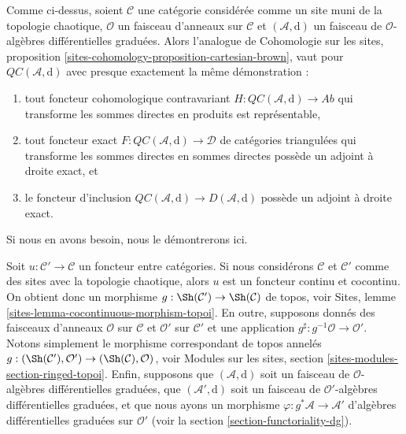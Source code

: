 \begin{remark}
\label{remark-cartesian-brown}
Comme ci-dessus, soient $\mathcal{C}$ une catégorie considérée comme
un site muni de la topologie chaotique, $\mathcal{O}$ un faisceau d'anneaux sur $\mathcal{C}$
et $(\mathcal{A}, \text{d})$ un faisceau de
$\mathcal{O}$-algèbres différentielles graduées. Alors l'analogue
de Cohomologie sur les sites,
proposition \ref{sites-cohomology-proposition-cartesian-brown},
vaut pour $\mathit{QC}(\mathcal{A}, \text{d})$ avec
presque exactement la même
démonstration : \begin{enumerate}
\item tout foncteur cohomologique
contravariant $H : \mathit{QC}(\mathcal{A}, \text{d}) \to \textit{Ab}$
qui transforme les sommes directes en produits est
représentable, \item tout
foncteur exact $F : \mathit{QC}(\mathcal{A}, \text{d}) \to \mathcal{D}$
de catégories triangulées qui transforme les sommes directes en
sommes directes possède un adjoint
à droite exact, et \item le
foncteur d'inclusion $\mathit{QC}(\mathcal{A}, \text{d}) \to D(\mathcal{A}, \text{d})$
possède un
adjoint à droite exact. \end{enumerate}
Si nous en avons besoin, nous le démontrerons ici.
\end{remark}

\noindent
Soit $u : \mathcal{C}' \to \mathcal{C}$ un foncteur entre catégories. Si nous
considérons $\mathcal{C}$ et $\mathcal{C}'$ comme des sites avec la
topologie chaotique, alors $u$ est un foncteur continu et cocontinu. On
obtient donc un morphisme $g : \Sh(\mathcal{C}') \to \Sh(\mathcal{C})$ de
topos, voir Sites, lemme \ref{sites-lemma-cocontinuous-morphism-topoi}. En
outre, supposons donnés des faisceaux d'anneaux $\mathcal{O}$ sur $\mathcal{C}$ et
$\mathcal{O}'$ sur $\mathcal{C}'$ et une application
$g^\sharp : g^{-1}\mathcal{O} \to \mathcal{O}'$.
Notons simplement le morphisme correspondant de topos annelés
$g : (\Sh(\mathcal{C}'), \mathcal{O}') \to (\Sh(\mathcal{C}), \mathcal{O})$, voir
Modules sur les sites, section \ref{sites-modules-section-ringed-topoi}.
Enfin, supposons que $(\mathcal{A}, \text{d})$ soit un faisceau de
$\mathcal{O}$-algèbres différentielles graduées, que
$(\mathcal{A}', \text{d})$ soit un faisceau de
$\mathcal{O}'$-algèbres différentielles graduées, et que nous ayons un morphisme
$\varphi : g^*\mathcal{A} \to \mathcal{A}'$ d'algèbres différentielles
graduées sur $\mathcal{O}'$ (voir la section \ref{section-functoriality-dg}).

